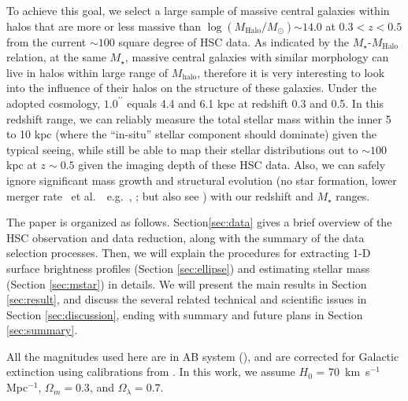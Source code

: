 \documentclass{emulateapj}
\def\arcsec{{\prime\prime}}
\def\etal{{\ et al.~}}
\def\mstar{{$M_{\star}$}}
\def\mhalo{{$M_{\mathrm{halo}}$}}
\def\logmh{{$\log (M_{\mathrm{Halo}}/M_{\odot})$}}
\begin{document}
\begin{CJK*}{UTF8}{gbsn}
    To achieve this goal, we select a large sample of massive central galaxies within
    halos that are more or less massive than \logmh{}$\sim 14.0$ at $0.3 < z < 0.5$ 
    from the current $\sim 100$ square degree of HSC data.
    As indicated by the $M_{\star}$-$M_{\mathrm{Halo}}$ relation, at the same \mstar{}, 
    massive central galaxies with similar morphology can live in halos within large range 
    of \mhalo{}, therefore it is very interesting to look into the influence of their halos 
    on the structure of these galaxies. 
    Under the adopted cosmology, $1.0^{\arcsec}$ equals 4.4 and 6.1 kpc at redshift 0.3 
    and 0.5.  
    In this redshift range, we can reliably measure the total stellar mass within the 
    inner 5 to 10 kpc (where the ``in-situ'' stellar component should dominate) given 
    the typical seeing, while still be able to map their stellar distributions out to 
    $\sim 100$ kpc at $z\sim 0.5$ given the imaging depth of these HSC data.
    Also, we can safely ignore significant mass growth and structural evolution 
    (no star formation, lower merger rate \etal~e.g.\ \citealt{Bellstedt2016},
    \citealt{Inagaki2015}; but also see \citealt{Bai2014}) 
    with our redshift and \mstar{} ranges. 

    The paper is organized as follows. Section\ref{sec:data} gives a brief overview of 
    the HSC observation and data reduction, along with the summary of the data selection
    processes.  
    Then, we will explain the procedures for extracting 1-D surface brightness profiles 
    (Section \ref{sec:ellipse}) and estimating stellar mass (Section \ref{sec:mstar}) in
    details.   
    We will present the main results in Section \ref{sec:result}, and discuss the several 
    related technical and scientific issues in Section \ref{sec:discussion}, ending with
    summary and future plans in Section \ref{sec:summary}.

    All the magnitudes used here are in AB system (\citealt{Oke1983}), and are corrected 
    for Galactic extinction using calibrations from \citet{Schlafly11}.
    In this work, we assume $H_0$ = 70~km~s$^{-1}$ Mpc$^{-1}$, ${\Omega}_m=0.3$, 
    and ${\Omega}_{\lambda}=0.7$. 


\end{CJK*}
\end{document}

